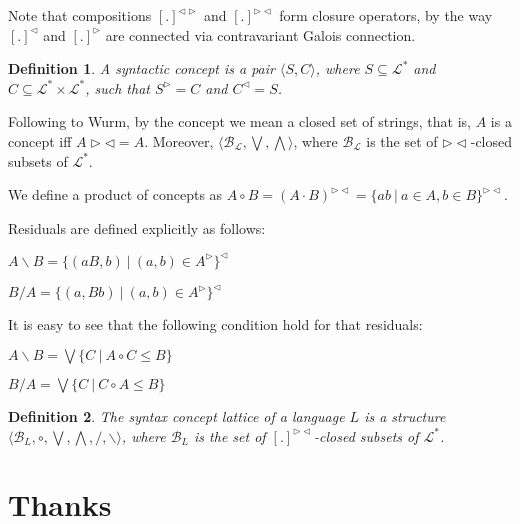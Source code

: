 \documentclass[a4paper]{article}
\theoremstyle{defin}
\newtheorem{defin}{Definition}
\theoremstyle{theorem}
\theoremstyle{prop}
\theoremstyle{lemma}
\theoremstyle{ex}
\theoremstyle{col}
\begin{document}
Note that compositions $[.]^{\triangleleft \triangleright}$ and $[.]^{\triangleright \triangleleft}$ form closure operators,
by the way $[.]^{\triangleleft}$ and $[.]^{\triangleright}$ are connected via contravariant Galois connection.

\begin{defin} A syntactic concept is a pair $\langle S, C \rangle$, where $S \subseteq \mathcal{L}^{*}$
  and $C \subseteq \mathcal{L}^{*} \times \mathcal{L}^{*}$, such that $S^{\triangleright} = C$ and $C^{\triangleleft} = S$.
\end{defin}

Following to Wurm, by the concept we mean a closed set of strings, that is, $A$ is a concept iff $A \triangleright
\triangleleft = A$. Moreover, $\langle \mathcal{B}_{\mathcal{L}}, \bigvee, \bigwedge \rangle$, where
$\mathcal{B}_{\mathcal{L}}$ is the set of $\triangleright \triangleleft$-closed subsets of $\mathcal{L}^{*}$.

We define a product of concepts as $A \circ B = (A \cdot B)^{\triangleright \triangleleft} = \{ a b \: | \: a \in A, b \in B \}^{\triangleright \triangleleft}$.

Residuals are defined explicitly as follows:

\begin{center}
  $A \backslash B = \{ (a B, b) \: | \: (a, b) \in A^{\triangleright} \}^{\triangleleft}$

  $B / A = \{ (a, B b) \: | \: (a, b) \in A^{\triangleright} \}^{\triangleleft}$
\end{center}

It is easy to see that the following condition hold for that residuals:

\begin{center}
  $A \backslash B = \bigvee \{ C \: | \: A \circ C \leq B \}$

  $B / A = \bigvee \{ C \: | \: C \circ A \leq B \}$
\end{center}

\begin{defin}
  The syntax concept lattice of a language $L$ is a structure $\langle \mathcal{B}_{L}, \circ, \bigvee, \bigwedge, /, \backslash \rangle$,
  where $\mathcal{B}_{L}$ is the set of $[.]^{\triangleright \triangleleft}$-closed subsets of $\mathcal{L}^{*}$.
\end{defin}

\section{Thanks}
\end{document}
